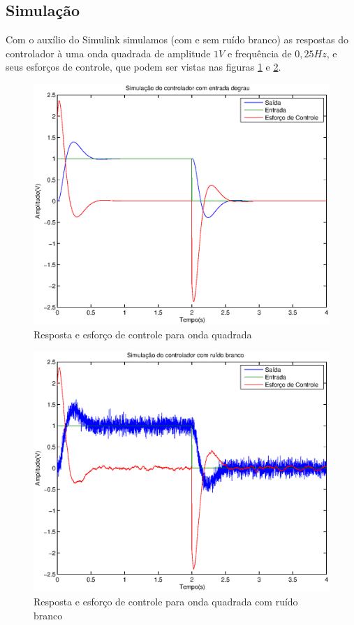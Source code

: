 \documentclass{article}
\begin{document}
\subsection{Simulação}
Com o auxílio do Simulink simulamos (com e sem ruído branco) as respostas do controlador à uma onda quadrada de amplitude $1V$ e frequência de $0,25Hz$, e seus esforços de controle, que podem ser vistas nas figuras \ref{fig:yur} e \ref{fig:yurN}.
\begin{figure}[H]
	\centering
	\includegraphics[width=0.8\linewidth]{../yur}
	\caption{Resposta e esforço de controle para onda quadrada}
	\label{fig:yur}
\end{figure}
\begin{figure}[H]
	\centering
	\includegraphics[width=0.8\linewidth]{../yurN}
	\caption{Resposta e esforço de controle para onda quadrada com ruído branco}
	\label{fig:yurN}
\end{figure}
\end{document}
